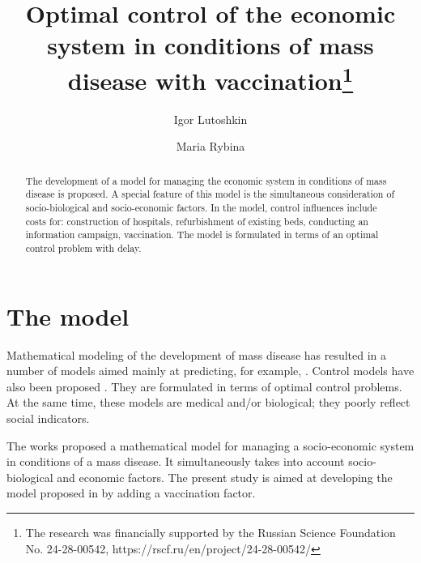 \documentclass[12pt]{llncs}
\begin{document}
\fi

\title{Optimal control of the economic system in conditions of mass disease with vaccination\thanks{The research was financially supported by the Russian Science Foundation No. 24-28-00542, https://rscf.ru/en/project/24-28-00542/}}

\author{Igor Lutoshkin  \and   Maria Rybina
}

\maketitle

\begin{abstract}
The development of a model for managing the economic system in conditions of mass disease is proposed. A special feature of this model is the simultaneous consideration of socio-biological and socio-economic factors. In the model, control influences include costs for: construction of hospitals, refurbishment of existing beds, conducting an information campaign, vaccination. The model is formulated in terms of an optimal control problem with delay.

\end{abstract}


\section{The model} %

Mathematical modeling of the development of mass disease has resulted in a number of models aimed mainly at predicting, for example, \cite{BraurCastChav2012,Gets2018,SietRus2013}. Control models have also been proposed \cite{GomRubMon2023,LueGPCerv2023,CastBlowDri2002}.  They are formulated in terms of optimal control problems. At the same time, these models are medical and/or biological; they poorly reflect social indicators.

The works \cite{LutoshRyb2023,LutoshRyb2023_2} proposed a mathematical model for managing a socio-economic system in conditions of a mass disease. It simultaneously takes into account socio-biological and economic factors. The present study is aimed at developing the model proposed in \cite{LutoshRyb2023,LutoshRyb2023_2} by adding a vaccination factor.
\end{document}
